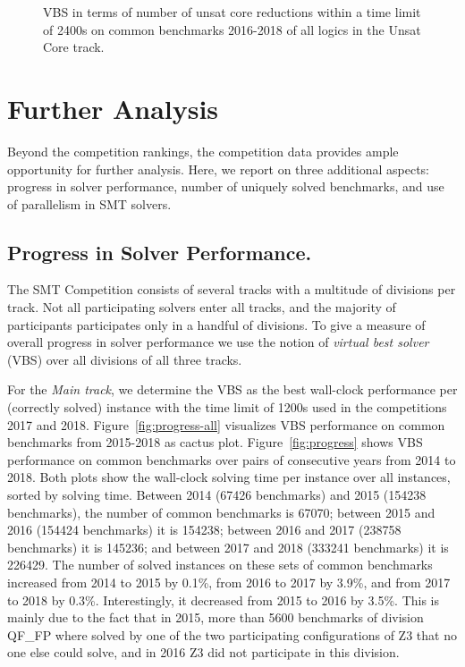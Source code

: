 \documentclass[dvipsnames,table,twoside,11pt]{article}
\begin{document}
\begin{figure}
  \centering
  \vspace{-5ex}
  \caption{VBS in terms of number of unsat core reductions
  within a time limit of 2400s
  on common benchmarks 2016-2018 of all logics in the Unsat Core 
  track.}
  \label{fig:progress-all-uc}
\end{figure}

\section{Further Analysis}

Beyond the competition rankings, the competition data provides ample
opportunity for further analysis.  Here, we report on three additional
aspects: progress in solver performance, number of uniquely solved
benchmarks, and use of parallelism in SMT solvers.

\subsection{Progress in Solver Performance.}

The SMT Competition consists of several tracks with a multitude of divisions
per track.
Not all participating solvers enter all tracks, and the majority of
participants participates only in a handful of divisions.
To give a measure of overall progress in solver performance we
use the notion of \emph{virtual best solver} (VBS) over all divisions of all
three tracks.

For the \emph{Main track}, we determine the VBS as the best wall-clock
performance per (correctly solved) instance with the time limit of 1200s used
in the competitions 2017 and 2018. Figure~\ref{fig:progress-all} visualizes VBS
performance on common benchmarks from 2015-2018 as cactus plot.
Figure~\ref{fig:progress} shows VBS performance on common benchmarks over pairs
of consecutive years from 2014 to 2018.  Both plots show the wall-clock solving
time per instance over all instances, sorted by solving time.
%
Between 2014 (67426 benchmarks) and 2015 (154238 benchmarks),
the number of common benchmarks is 67070;
between 2015 and 2016 (154424 benchmarks) it is 154238;
between 2016 and 2017 (238758 benchmarks) it is 145236;
and between 2017 and 2018 (333241 benchmarks) it is 226429.
The number of solved instances on these sets of common benchmarks
increased from 2014 to 2015 by 0.1\%, from 2016 to 2017 by 3.9\%,
and from 2017 to 2018 by 0.3\%.
Interestingly, it decreased from 2015 to 2016 by 3.5\%.
This is mainly due to the fact that in 2015, more than 5600 benchmarks of
division QF\_FP where solved by one of the two participating configurations of
Z3 that no one else could solve, and in 2016 Z3 did not participate in this
division.
\end{document}
